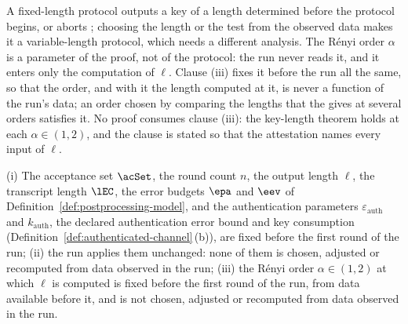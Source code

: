 
A fixed-length protocol outputs a key of a length determined before the
protocol begins, or aborts \cite[Sec.~2.2]{tupkary2025survey}; choosing the
length or the test from the observed data makes it a variable-length
protocol, which needs a different analysis. The R\'enyi order $\alpha$ is a
parameter of the proof, not of the protocol: the run never reads it, and it
enters only the computation of $\ell$. Clause (iii) fixes it before the run
all the same, so that the order, and with it the length computed at it, is
never a function of the run's data; an order chosen by comparing the
lengths that the  gives at several orders satisfies it.
No proof consumes clause (iii): the key-length theorem holds at each
$\alpha\in(1,2)$, and the clause is stated so that the attestation names
every input of $\ell$.

\begin{assumption}\label{ass:fixed}
(i) The acceptance set $\acSet$, the round count $n$, the output length
$\ell$, the transcript length $\lEC$, the error budgets $\epa$ and $\eev$ of
Definition~\ref{def:postprocessing-model}, and the authentication parameters
$\varepsilon_{\mathrm{auth}}$ and $k_{\mathrm{auth}}$, the declared
authentication error bound and key consumption
(Definition~\ref{def:authenticated-channel}\,(b)), are fixed before the
first round of the run;
(ii) the run applies them unchanged: none of them is chosen, adjusted or
recomputed from data observed in the run;
(iii) the R\'enyi order $\alpha\in(1,2)$ at which $\ell$ is computed is
fixed before the first round of the run, from data available before it, and
is not chosen, adjusted or recomputed from data observed in the run.
\end{assumption}
